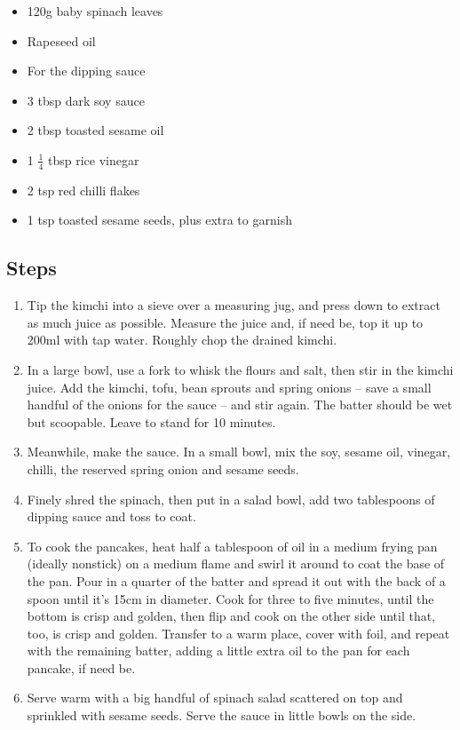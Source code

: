 \documentclass{book}
\begin{document}
\begin{itemize}
\item 120g baby spinach leaves
\item Rapeseed oil
\item For the dipping sauce
\item 3 tbsp dark soy sauce
\item 2 tbsp toasted sesame oil
\item 1 $\frac{1}{4}$ tbsp rice vinegar
\item 2 tsp red chilli flakes
\item 1 tsp toasted sesame seeds, plus extra to garnish 
\end{itemize}

\subsection*{Steps}
\begin{enumerate}
\item Tip the kimchi into a sieve over a measuring jug, and press down to extract as much juice as possible. Measure the juice and, if need be, top it up to 200ml with tap water. Roughly chop the drained kimchi.
\item In a large bowl, use a fork to whisk the flours and salt, then stir in the kimchi juice. Add the kimchi, tofu, bean sprouts and spring onions – save a small handful of the onions for the sauce – and stir again. The batter should be wet but scoopable. Leave to stand for 10 minutes.
\item Meanwhile, make the sauce. In a small bowl, mix the soy, sesame oil, vinegar, chilli, the reserved spring onion and sesame seeds.
\item Finely shred the spinach, then put in a salad bowl, add two tablespoons of dipping sauce and toss to coat.
\item To cook the pancakes, heat half a tablespoon of oil in a medium frying pan (ideally nonstick) on a medium flame and swirl it around to coat the base of the pan. Pour in a quarter of the batter and spread it out with the back of a spoon until it’s 15cm in diameter. Cook for three to five minutes, until the bottom is crisp and golden, then flip and cook on the other side until that, too, is crisp and golden. Transfer to a warm place, cover with foil, and repeat with the remaining batter, adding a little extra oil to the pan for each pancake, if need be.
\item Serve warm with a big handful of spinach salad scattered on top and sprinkled with sesame seeds. Serve the sauce in little bowls on the side.
\end{enumerate}
\newpage
\end{document}

